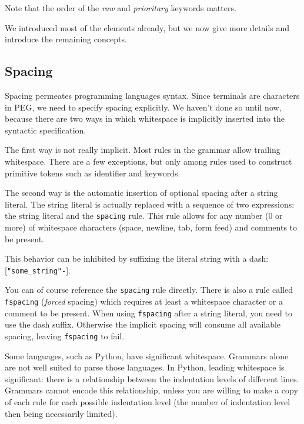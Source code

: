 Note that the order of the \emph{raw} and \emph{prioritary} keywords matters.

We introduced most of the elements already, but we now give more details and
introduce the remaining concepts.

\subsection{Spacing}


Spacing permeates programming languages syntax. Since terminals are characters
in PEG, we need to specify spacing explicitly. We haven't done so until now,
because there are two ways in which whitespace is implicitly inserted into the
syntactic specification.

The first way is not really implicit. Most rules in the grammar allow trailing
whitespace. There are a few exceptions, but only among rules used to construct
primitive tokens such as identifier and keywords.

The second way is the automatic insertion of optional spacing after a string
literal. The string literal is actually replaced with a sequence of two
expressions: the string literal and the \texttt{spacing} rule. This rule allows
for any number (0 or more) of whitespace characters (space, newline, tab, form
feed) and comments to be present.

This behavior can be inhibited by suffixing the literal string with a dash:
[\lstinline{"some_string"-}].

You can of course reference the \texttt{spacing} rule directly. There is also a
rule called \texttt{fspacing} (\emph{forced} spacing) which requires at least a
whitespace character or a comment to be present. When using \texttt{fspacing}
after a string literal, you need to use the dash suffix. Otherwise the implicit
spacing will consume all available spacing, leaving \texttt{fspacing} to fail.

Some languages, such as Python, have significant whitespace. Grammars alone are
not well suited to parse those languages. In Python, leading whitespace is
significant: there is a relationship between the indentation levels of different
lines. Grammars cannot encode this relationship, unless you are willing to make
a copy of each rule for each possible indentation level (the number of
indentation level then being necessarily limited).

